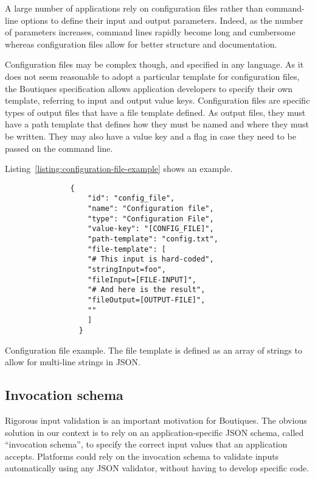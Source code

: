 \documentclass{article}
\begin{document}
A large number of applications rely on configuration files rather than
command-line options to define their input and output
parameters. Indeed, as the number of parameters increases, command
lines rapidly become long and cumbersome whereas configuration files
allow for better structure and documentation.

Configuration files may be complex though, and specified in any
language.  As it does not seem reasonable to adopt a particular
template for configuration files, the Boutiques specification allows
application developers to specify their own template, referring to
input and output value keys. Configuration files are specific types of
output files that have a
 file template defined. As output files, 
they must have a path template that defines
how they must be named and where they must be written. They may also
have a value key and a flag in case they need to be passed on the
command line. 


Listing~\ref{listing:configuration-file-example} shows an example.
\begin{listing}
\begin{verbatim}
               {
                   "id": "config_file",
                   "name": "Configuration file",
                   "type": "Configuration File",
                   "value-key": "[CONFIG_FILE]",
                   "path-template": "config.txt",
                   "file-template": [
                   "# This input is hard-coded",
                   "stringInput=foo",
                   "fileInput=[FILE-INPUT]",
                   "# And here is the result",
                   "fileOutput=[OUTPUT-FILE]",
                   ""
                   ]
                 }
\end{verbatim}
\caption{Configuration file example. The file template is defined as
  an array of strings to allow for multi-line strings in JSON.}
\label{listing:configuration-file-example}
\end{listing}

\subsection{Invocation schema}
\label{sec:invocation-schema}

Rigorous input validation is an important motivation for
Boutiques. The obvious solution in our context is to rely on an
application-specific JSON schema, called ``invocation schema'', to
specify the correct input values that an application
accepts. Platforms could rely on the invocation schema to validate
inputs automatically using any JSON validator, without having to
develop specific code.
\end{document}
